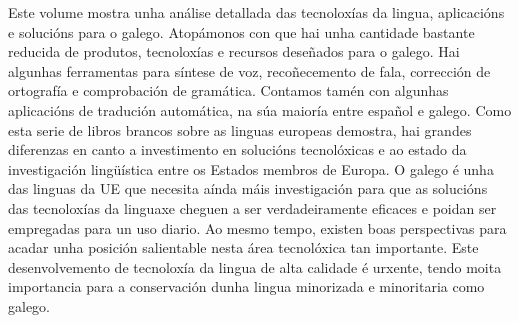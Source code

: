 \begin{multicols}{2}
Este volume mostra unha análise detallada das tecnoloxías da lingua, aplicacións e solucións para o galego. Atopámonos con que hai unha cantidade bastante reducida de produtos, tecnoloxías e recursos deseñados para o galego. Hai algunhas ferramentas para síntese de voz, recoñecemento de fala, corrección de ortografía e comprobación de gramática. Contamos  tamén con algunhas aplicacións de tradución automática, na súa maioría entre español e galego. Como esta serie de libros brancos sobre as linguas europeas demostra, hai grandes diferenzas en canto a investimento en solucións tecnolóxicas e ao estado da investigación lingüística entre os Estados membros de Europa.  O galego é unha das linguas da UE que necesita aínda máis investigación para que as solucións das tecnoloxías da linguaxe cheguen a ser verdadeiramente eficaces e poidan ser empregadas para un uso diario. Ao mesmo tempo, existen boas perspectivas para acadar unha posición salientable nesta área tecnolóxica tan importante. Este desenvolvemento de tecnoloxía da lingua de alta calidade é urxente, tendo moita importancia para a conservación dunha lingua minorizada e minoritaria como galego.


\end{multicols}

\clearpage



